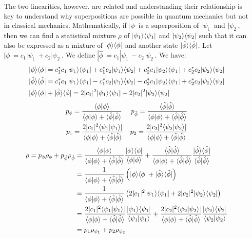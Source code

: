 The two linearities, however, are related and understanding their relationship is key to understand why superpositions are possible in quantum mechanics but not in classical mechanics. Mathematically, if $|\phi\>$ is a superposition of $|\psi_1\>$ and $|\psi_2\>$, then we can find a statistical mixture $\rho$ of $|\psi_1\rangle\langle\psi_1|$ and $|\psi_2\rangle\langle\psi_2|$ such that it can also be expressed as a mixture of $|\phi\rangle\langle\phi|$ and another state $|\hat{\phi}\rangle\langle\hat{\phi}|$. Let $|\phi\> = c_1 |\psi_1\> + c_2 |\psi_2\>$. We define $|\hat{\phi}\> = c_1 |\psi_1\> - c_2 |\psi_2\>$. We have:
\begin{equation}
	\begin{aligned}
		| \phi \rangle \langle \phi | &= c_1^* c_1 | \psi_1 \rangle \langle \psi_1 | + c_1^* c_2 | \psi_1 \rangle \langle \psi_2 | + c_2^* c_1 | \psi_2 \rangle \langle \psi_1 | + c_2^* c_2 | \psi_2 \rangle \langle \psi_2 | \\
		| \hat{\phi} \rangle \langle \hat{\phi} | &= c_1^* c_1 | \psi_1 \rangle \langle \psi_1 | - c_1^* c_2 | \psi_1 \rangle \langle \psi_2 | - c_2^* c_1 | \psi_2 \rangle \langle \psi_1 | + c_2^* c_2 | \psi_2 \rangle \langle \psi_2 | \\
		| \phi \rangle \langle \phi | &+ | \hat{\phi} \rangle \langle \hat{\phi} | = 2 |c_1|^2 | \psi_1 \rangle \langle \psi_1 | + 2 |c_2|^2 | \psi_2 \rangle \langle \psi_2 |
	\end{aligned}
\end{equation}\begin{equation}
\begin{aligned}
	p_{\phi} &= \frac{\langle\phi|\phi\rangle}{\langle\phi|\phi\rangle + \langle\hat{\phi}|\hat{\phi}\rangle} 
	&p_{\hat{\phi}} = \frac{\langle\hat{\phi}|\hat{\phi}\rangle}{\langle\phi|\phi\rangle + \langle\hat{\phi}|\hat{\phi}\rangle} \\
	p_{1} &= \frac{2 |c_1|^2 \langle \psi_1 | \psi_1 \rangle |}{\langle\phi|\phi\rangle + \langle\hat{\phi}|\hat{\phi}\rangle} 
	&p_{2} = \frac{2 |c_2|^2 \langle \psi_2 | \psi_2 \rangle |}{\langle\phi|\phi\rangle + \langle\hat{\phi}|\hat{\phi}\rangle}
\end{aligned}
\end{equation}
\begin{equation}
	\begin{aligned}
		\rho = p_{\phi} \rho_{\phi} + p_{\hat{\phi}} \rho_{\hat{\phi}} &= \frac{\langle\phi|\phi\rangle}{\langle\phi|\phi\rangle + \langle\hat{\phi}|\hat{\phi}\rangle} \frac{| \phi \rangle \langle \phi |}{\langle \phi | \phi \rangle} + \frac{\langle\hat{\phi}|\hat{\phi}\rangle}{\langle\phi|\phi\rangle + \langle\hat{\phi}|\hat{\phi}\rangle} \frac{| \hat{\phi} \rangle \langle \hat{\phi} |}{\langle \hat{\phi} | \hat{\phi} \rangle} \\
		&=\frac{1}{\langle\phi|\phi\rangle + \langle\hat{\phi}|\hat{\phi}\rangle} \left(| \phi \rangle \langle \phi | + | \hat{\phi} \rangle \langle \hat{\phi} |\right) \\
		&=\frac{1}{\langle\phi|\phi\rangle + \langle\hat{\phi}|\hat{\phi}\rangle} \left(2 |c_1|^2 | \psi_1 \rangle \langle \psi_1 | + 2 |c_2|^2 | \psi_2 \rangle \langle \psi_2 |\right) \\
		&=\frac{2 |c_1|^2 \langle \psi_1 | \psi_1 \rangle |}{\langle\phi|\phi\rangle + \langle\hat{\phi}|\hat{\phi}\rangle} \frac{| \psi_1 \rangle \langle \psi_1 |}{\langle \psi_1 | \psi_1 \rangle} + \frac{2 |c_2|^2 \langle \psi_2 | \psi_2 \rangle |}{\langle\phi|\phi\rangle + \langle\hat{\phi}|\hat{\phi}\rangle} \frac{| \psi_2 \rangle \langle \psi_2 |}{\langle \psi_2 | \psi_2 \rangle} \\
		&=p_{1} \rho_{\psi_1} + p_{2} \rho_{\psi_2} \\
	\end{aligned}
\end{equation}
